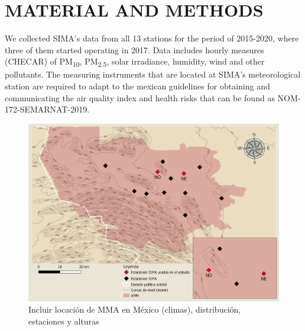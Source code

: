 \section{MATERIAL AND METHODS}

We collected SIMA’s data from all 13 stations for the period of 2015-2020, where three of them started operating in 2017. Data includes hourly measures (CHECAR) of PM\textsubscript{10}, PM\textsubscript{2.5}, solar irradiance, humidity, wind and other pollutants. The measuring instruments that are located at SIMA’s meteorological station are required to adapt to the mexican guidelines for obtaining and communicating the air quality index and health risks that can be found as NOM-172-SEMARNAT-2019.
\begin{figure}[H]
    \centering
    \includegraphics[scale=0.15]{images/map.png}
    \caption{Incluir locación de MMA en México (climas), distribución, estaciones y alturas}
    \label{fig:map}
\end{figure}

